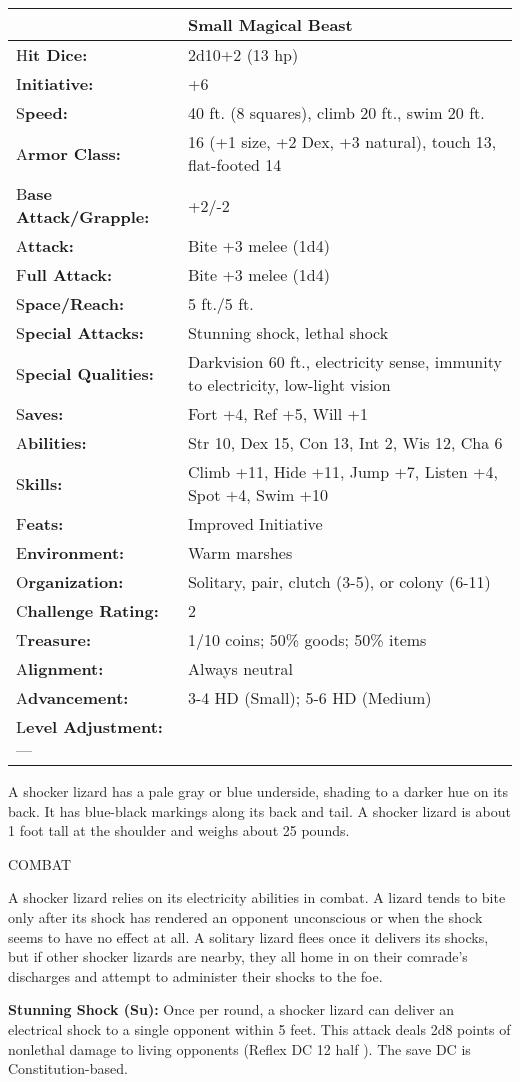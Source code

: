 \documentclass{article}
\begin{document}
\begin{tabular}{|>{\raggedright}p{77pt}|>{\raggedright}p{249pt}|}
\hline
  & Small Magical Beast\tabularnewline
\hline
H\textbf{it Dice:} & 2d10+2 (13 hp)\tabularnewline
\hline
I\textbf{nitiative:} & +6\tabularnewline
\hline
S\textbf{peed:} & 40 ft. (8 squares), climb 20 ft., swim 20 ft.\tabularnewline
\hline
A\textbf{rmor Class:} & 16 (+1 size, +2 Dex, +3 natural), touch 13, flat-footed 
14\tabularnewline
\hline
B\textbf{ase Attack/Grapple:} & +2/-2\tabularnewline
\hline
A\textbf{ttack:} & Bite +3 melee (1d4)\tabularnewline
\hline
F\textbf{ull Attack:} & Bite +3 melee (1d4)\tabularnewline
\hline
S\textbf{pace/Reach:} & 5 ft./5 ft.\tabularnewline
\hline
S\textbf{pecial Attacks:} & Stunning shock, lethal shock\tabularnewline
\hline
S\textbf{pecial Qualities:} & Darkvision 60 ft., electricity sense, immunity to 
electricity, low-light vision\tabularnewline
\hline
S\textbf{aves:} & Fort +4, Ref +5, Will +1\tabularnewline
\hline
A\textbf{bilities:} & Str 10, Dex 15, Con 13, Int 2, Wis 12, Cha 6\tabularnewline
\hline
S\textbf{kills:} & Climb +11, Hide +11, Jump +7, Listen +4, Spot +4, Swim +10\tabularnewline
\hline
F\textbf{eats:} & Improved Initiative\tabularnewline
\hline
E\textbf{nvironment:} & Warm marshes\tabularnewline
\hline
O\textbf{rganization:} & Solitary, pair, clutch (3-5), or colony (6-11)\tabularnewline
\hline
C\textbf{hallenge Rating:} & 2\tabularnewline
\hline
T\textbf{reasure:} & 1/10 coins; 50\% goods; 50\% items\tabularnewline
\hline
A\textbf{lignment:} & Always neutral\tabularnewline
\hline
A\textbf{dvancement:} & 3-4 HD (Small); 5-6 HD (Medium)\tabularnewline
\hline
L\textbf{evel Adjustment:}--- & \tabularnewline
\hline
\end{tabular}

A shocker lizard has a pale gray or blue underside, shading to a darker hue on 
its back. It has blue-black markings along its back and tail. A shocker lizard 
is about 1 foot tall at the shoulder and weighs about 25 pounds.

COMBAT

A shocker lizard relies on its electricity abilities in combat. A lizard tends 
to bite only after its shock has rendered an opponent unconscious or when the shock 
seems to have no effect at all. A solitary lizard flees once it delivers its shocks, 
but if other shocker lizards are nearby, they all home in on their comrade's discharges 
and attempt to administer their shocks to the foe. 

\textbf{Stunning Shock (Su):} Once per round, a shocker lizard can deliver an electrical 
shock to a single opponent within 5 feet. This attack deals 2d8 points of nonlethal 
damage to living opponents (Reflex DC 12 half ). The save DC is Constitution-based.
\end{document}

